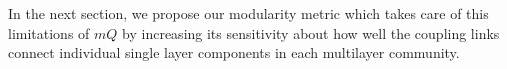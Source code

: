 In the next section, we propose our modularity metric which takes care of this limitations of $mQ$ by increasing its sensitivity about
how well the coupling links connect individual single layer components in each multilayer community.
% 
% 
% 
